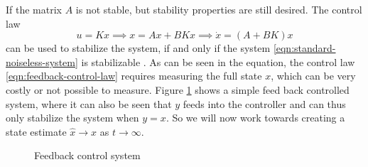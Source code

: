 If the matrix $A$ is not stable, but stability properties are still desired. The control law
\begin{equation}\label{eqn:feedback-control-law}
    u = Kx \implies x = Ax + BKx \implies \dot{x} = (A+BK)x
\end{equation}
can be used to stabilize the system, if and only if the system \eqref{eqn:standard-noiseless-system} is stabilizable \cite[Th. 14.5]{Hespanha2018LinearTheory}. As can be seen in the equation, the control law \eqref{eqn:feedback-control-law} requires measuring the full state $x$, which can be very costly or not possible to measure. Figure \ref{fig:feedback-diagram} shows a simple feed back controlled system, where it can also be seen that $y$ feeds into the controller and can thus only stabilize the system when $y=x$. So we will now work towards creating a state estimate $\hat{x} \rightarrow x$ as $t \rightarrow \infty$.

\begin{figure}[ht]
    \centering
    \caption{Feedback control system}
    \label{fig:feedback-diagram}
\end{figure}
 
